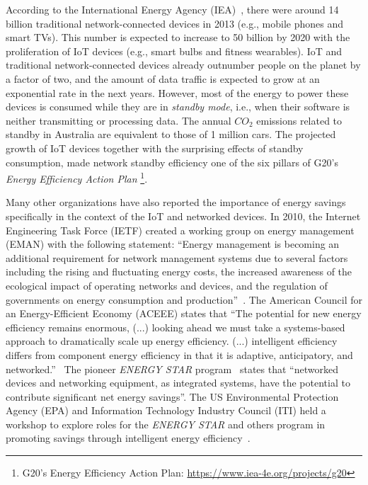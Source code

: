 \documentclass[12pt,english]{amsart}
\begin{document}
According to the International Energy Agency (IEA)~\cite{iea.data}, there were
around 14 billion traditional network-connected devices in 2013 (e.g., mobile
phones and smart TVs).
This number is expected to increase to 50 billion by 2020 with
the proliferation of IoT devices (e.g., smart bulbs and fitness wearables).
%
IoT and traditional network-connected devices already outnumber people on the
planet by a factor of two, and the amount of data traffic is expected to grow
at an exponential rate in the next years.
%
However, most of the energy to power these devices is consumed while they are
in \emph{standby mode}, i.e., when their software is neither transmitting or
processing data.
%
The annual $CO_2$ emissions related to standby in Australia are equivalent to
those of 1 million cars.
%
%
The projected growth of IoT devices together with the surprising effects of
standby consumption, made network standby efficiency one of the six
pillars of G20's \emph{Energy Efficiency Action Plan}%
\footnote{G20's Energy Efficiency Action Plan: \url{https://www.iea-4e.org/projects/g20}}.

Many other organizations have also reported the importance of energy savings
specifically in the context of the IoT and networked devices.
%
In 2010, the Internet Engineering Task Force (IETF) created a working group on energy
management (EMAN) with the following statement:
``Energy management is becoming an additional requirement for network
management systems due to several factors including the rising and
fluctuating energy costs, the increased awareness of the ecological
impact of operating networks and devices, and the regulation of
governments on energy consumption and production''~\cite{ietf.eman}.
%
The American Council for an Energy-Efficient Economy (ACEEE) states that
``The potential for new energy efficiency remains enormous, (...) looking
ahead we must take a systems-based approach to dramatically scale up energy
efficiency.
(...) intelligent efficiency differs from component energy efficiency in that
it is adaptive, anticipatory, and networked.''~\cite{aceee.1}
%
The pioneer \emph{ENERGY STAR} program~\cite{energystar} states that
``networked devices and networking equipment, as integrated systems, have the
potential to contribute significant net energy savings''.
%
The US Environmental Protection Agency (EPA) and Information Technology
Industry Council (ITI) held a workshop to explore roles for the \emph{ENERGY
STAR} and others program in promoting savings through intelligent energy
efficiency~\cite{aceee.2}.
\end{document}
